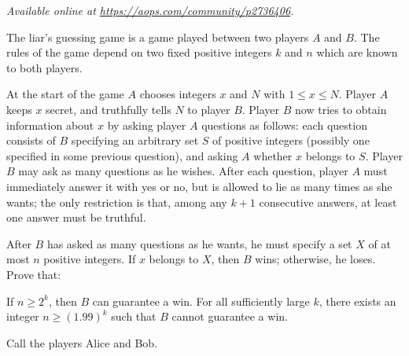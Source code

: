 \textsl{Available online at \url{https://aops.com/community/p2736406}.}
\begin{mdframed}[style=mdpurplebox,frametitle={Problem statement}]
The liar's guessing game is a game played between two players $A$ and $B$.
The rules of the game depend on two fixed positive integers $k$ and $n$
which are known to both players.

At the start of the game $A$
chooses integers $x$ and $N$ with $1 \le x \le N$.
Player $A$ keeps $x$ secret, and truthfully tells $N$ to player $B$.
Player $B$ now tries to obtain information about $x$
by asking player $A$ questions as follows:
each question consists of $B$ specifying an arbitrary set $S$
of positive integers (possibly one specified in some previous question),
and asking $A$ whether $x$ belongs to $S$.
Player $B$ may ask as many questions as he wishes.
After each question, player $A$ must immediately answer
it with yes or no, but is allowed to lie as many times as she wants;
the only restriction is that, among any $k+1$ consecutive answers,
at least one answer must be truthful.

After $B$ has asked as many questions as he wants,
he must specify a set $X$ of at most $n$ positive integers.
If $x$ belongs to $X$, then $B$ wins;
otherwise, he loses.
Prove that:

\begin{enumerate}[(a)]
  \ii If $n \ge 2^k$, then $B$ can guarantee a win.
  \ii For all sufficiently large $k$,
  there exists an integer $n \ge (1.99)^k$
  such that $B$ cannot guarantee a win.
\end{enumerate}
\end{mdframed}
Call the players Alice and Bob.

